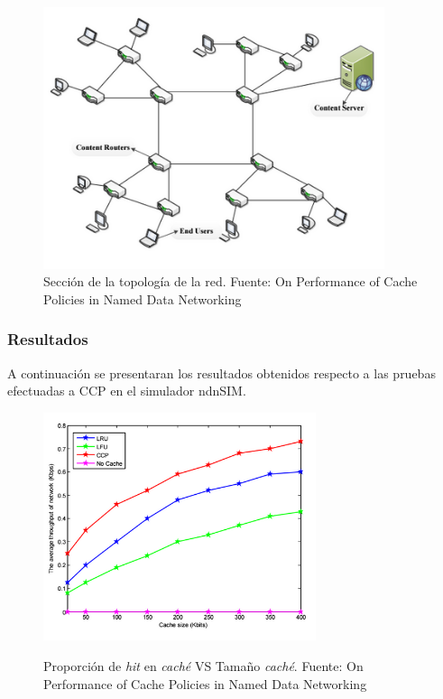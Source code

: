 \documentclass[12pt]{ociamthesis}  %
\begin{document}
\begin{figure}[h]
	\centering
	\includegraphics[width=10cm]{Imagenes/Paper1.1/Topologia_de_red}
	\caption{Sección de la topología de la red. Fuente: On Performance of Cache Policies in Named Data Networking \cite{ran2013performance}}
	\label{topologia_de_red}
\end{figure}

\subsubsection{Resultados}
A continuación se presentaran los resultados obtenidos respecto a las pruebas efectuadas a CCP en el simulador ndnSIM.

\begin{figure}[!htb]
	\centering
	\includegraphics[width=8cm]{Imagenes/Paper1.1/Grafico_cache_hit_vs_size}\\
	\caption{Proporción de \textit{hit} en \textit{caché} VS Tamaño \textit{caché}. Fuente: On Performance of Cache Policies in Named Data Networking \cite{ran2013performance}}
	\label{hit_vs_size}
\end{figure}
\end{document}
